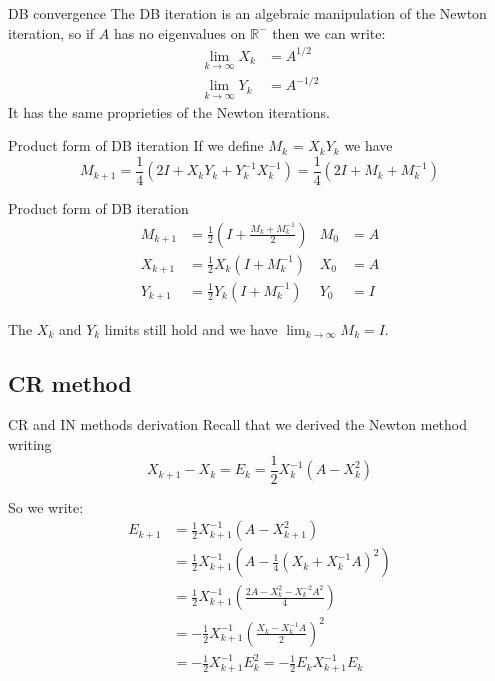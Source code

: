 \documentclass{beamer}
\theoremstyle{plain}
\theoremstyle{definition}
\theoremstyle{remark}
\newcommand{\pa}[1]{\left(#1\right)}
\begin{document}
\begin{frame}{DB convergence}
  The DB iteration is an algebraic manipulation of the Newton
  iteration, so if $A$ has no eigenvalues on $\mathbb{R}^-$ then we
  can write:
  \begin{align*}
    \lim _{k \to \infty} X_k &= A^{1/2} \\
    \lim _{k\to \infty} Y_k &= A^{-1/2}
  \end{align*}  
  It has the same proprieties of the Newton iterations.
\end{frame}

\begin{frame}{Product form of DB iteration}
  If we define $M_k$ = $X_kY_k$ we have
  \[ M_{k+1} = \frac{1}{4}\pa{2 I + X_kY_k + Y_k^{-1}X_k^{-1}} =
    \frac{1}{4}\pa{2I + M_k + M_k^{-1}} \]
  \begin{block}{Product form of DB iteration}
    \begin{align*}
      M_{k+1} &= \frac{1}{2}\pa{ I + \frac{M_k + M_k^{-1}}{2}} & M_0 &=
                                                                      A
      \\
      X_{k+1} &= \frac{1}{2} X_k\pa{I+M_k^{-1}} & X_0 &= A \\
      Y_{k+1} &= \frac{1}{2} Y_k\pa{I+M_k^{-1}} & Y_0 &= I
    \end{align*}
  \end{block}
  The $X_k$ and $Y_k$ limits still hold and we have $\lim _{k\to
    \infty} M_k = I$.
\end{frame}

\subsection{CR method}

\begin{frame}{CR and IN methods derivation}
  Recall that we derived the Newton method writing
  \[ X_{k+1} - X_k = E_{k} = \frac{1}{2} X_k^{-1} \pa{A-X_k^2} \]
  
  So we write:
  \begin{align*}
    E_{k+1} &= \frac{1}{2}X_{k+1}^{-1}\pa{A-X_{k+1}^2} \\
    &= \frac{1}{2}X_{k+1}^{-1}\pa{A-\frac{1}{4}\pa{X_k +X_k^{-1}A}^2}
    \\
    &= \frac{1}{2}X_{k+1}^{-1}\pa{\frac{2A-X_k^2 -X_k^{-2}A^2}{4}} \\
    &= -\frac{1}{2}X_{k+1}^{-1}\pa{\frac{X_k - X_k^{-1}A}{2}}^2  \\
    &= -\frac{1}{2}X_{k+1}^{-1}E_k^2 = -\frac{1}{2}E_kX_{k+1}^{-1}E_k
  \end{align*}
\end{frame}
\end{document}
